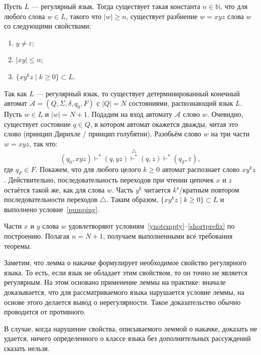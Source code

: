 \begin{mytheorem}
\label{theorem-PumpingLemma}
Пусть $L$ — регулярный язык.
Тогда существует такая константа $n\in \mathbb N$, что для любого слова $w \in L$,
такого что $|w|\geqslant n$, существует разбиение $w=xyz$ слова $w$ со следующими свойствами:
\begin{enumerate}
  \item\label{ynotempty} $y \neq \varepsilon$;
  \item\label{shortprefix} $|xy| \leqslant n$;
  \item\label{pumping} $\{ xy^kz \mid k \geqslant 0\} \subset L$.
\end{enumerate}
\end{mytheorem}
\begin{myproof}
Так как $L$ --- регулярный язык, то существует детерминированный конечный автомат
$\mathcal A=(Q, \Sigma, \delta, q_0, F)$ с $|Q|=N$ состояниями, распознающий
язык $L$. Пусть $w \in L$ и $|w|=N+1$. Подадим на вход автомату $\mathcal A$
слово $w$. Очевидно, существует состояние $q \in Q$, в котором автомат окажется
дважды, читая это слово (принцип Дирихле / принцип голубятни). Разобьём слово
$w$ на три части $w=xyz$, так что:
\[
    (q_0, xyz) \vdash^*  (q, yz) \stackrel{\bigtriangleup}{\vdash^*} (q, z)
    \vdash^* (q_F, \varepsilon),
\]
где $q_F \in F$. Покажем, что для любого целого $k \geqslant 0$ автомат
распознает слово $xy^kz$. Действительно, последовательность переходов при чтении
цепочек $x$ и $z$ остаётся такой же, как для слова $w$. Часть $y^k$ читается
$k$"/кратным повтором последовательности переходов $\bigtriangleup$. Таким
образом, $\{ xy^kz \mid k \geqslant 0\} \subset L$ и выполнено
условие~\ref{pumping}.

Части $x$ и $y$ слова $w$ удовлетворяют
условиям~\ref{ynotempty}–\ref{shortprefix} по построению. Полагая
$n=N+1$, получаем выполненными все требования теоремы.
\end{myproof}

Заметим, что лемма о накачке формулирует необходимое свойство регулярного языка. То есть, если язык не обладает этим свойством, то он точно не является регулярным. На этом основано применение леммы на практике: вначале доказывается, что для рассматриваемого языка нарушается условие леммы, на основе этого делается вывод о нерегулярности. Такое доказательство обычно проводится от противного.

В случае, когда нарушение свойства, описываемого леммой о накачке, доказать не удается, ничего определенного о классе языка без дополнительных рассуждений сказать нельзя.

